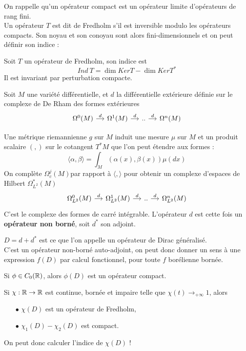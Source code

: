 \documentclass{beamer}
\begin{document}
\begin{frame}
On rappelle qu'un opérateur compact est un opérateur limite d'opérateurs de rang fini. \\
Un opérateur $T$ est dit de Fredholm s'il est inversible modulo les opérateurs compacts. Son noyau et son conoyau sont alors fini-dimensionnels et on peut définir son indice :
\begin{definition}Soit $T$ un opérateur de Fredholm, son indice est
\[Ind\ T = \dim Ker T-\dim Ker T^*\] 
Il est invariant par perturbation compacte.
\end{definition}
Soit $M$ une variété différentielle, et $d$ la différentielle extérieure définie sur le complexe de De Rham des formes extérieures
\[\begin{tikzcd}[ampersand replacement=\&,column sep = small]
\Omega^0(M) \arrow{r}{d} \& \Omega^1(M) \arrow{r}{d} \& .. \arrow{r}{d} \& \Omega^n(M)  
\end{tikzcd}\]
\end{frame}

\begin{frame}
Une métrique riemannienne $g$ sur $M$ induit une mesure $\mu$ sur $M$ et un produit scalaire $(,)$ sur le cotangent $T^* M$ que l'on peut étendre aux formes :
\[\langle \alpha,\beta\rangle = \int_M (\alpha(x),\beta(x))\mu(dx)\]
On complète $\Omega^j_c(M)$par rapport à $\langle,\rangle$ pour obtenir un complexe d'espaces de Hilbert $\Omega^*_{L^2}(M)$
\[\begin{tikzcd}[ampersand replacement=\&,column sep = small]
\Omega_{L^2}^0(M) \arrow{r}{d} \& \Omega_{L^2}^1(M) \arrow{r}{d} \& .. \arrow{r}{d} \& \Omega_{L^2}^n(M)  
\end{tikzcd}\]
C'est le complexe des formes de carré intégrable. L'opérateur $d$ est cette fois un \textbf{opérateur non borné}, soit $d^*$ son adjoint.
\end{frame}

\begin{frame}
$D= d+d^*$ est ce que l'on appelle un opérateur de Dirac généralisé. \\
C'est un opérateur non-borné auto-adjoint, on peut donc donner un sens à une expression $f(D)$ par calcul fonctionnel, pour toute $f$ borélienne bornée.\\
\begin{thm}
Si $\phi\in C_0(\mathbb R)$, alors $\phi(D)$ est un opérateur compact.
\end{thm}

Si $\chi : \mathbb R\rightarrow \mathbb R$ est continue, bornée et impaire telle que $\chi (t)\rightarrow_{+\infty} 1$, alors 
\begin{itemize}
\item[$\bullet$] $\chi(D)$ est un opérateur de Fredholm,
\item[$\bullet$] $\chi_1(D)-\chi_2(D)$ est compact.
\end{itemize}
On peut donc calculer l'indice de $\chi(D)$ !
\end{frame}
\end{document}
